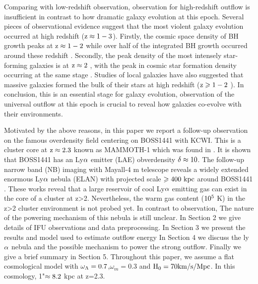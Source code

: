 \documentclass[../main.tex]{subfiles}
\begin{document}
Comparing with low-redshift observation, observation for high-redshift outflow is insufficient in contrast to how dramatic galaxy evolution at this epoch. Several pieces of observational evidence suggest that the most violent galaxy evolution occurred at high redshift ($\rm z \approx 1-3$). Firstly, the cosmic space density of BH growth peaks at $\rm z \approx 1-2$ while over half of the integrated BH growth occurred around these redshift \citep{schmidt1983quasar,richards2006sloan}. Secondly, the peak density of the most intensely star-forming galaxies is at $\rm z \approx 2$ \citep{chapman2005redshift,wardlow2011laboca}, with the peak in cosmic star formation density occurring at the same stage \citep{madau1996high,lilly1999canada,madau2014cosmic}. Studies of local galaxies have also suggested that massive galaxies formed the bulk of their stars at high redshift ($\rm z \geqslant 1-2$ ). In conclusion, this is an essential stage for galaxy evolution, observation of the universal outflow at this epoch is crucial to reveal how galaxies co-evolve with their environments. 

Motivated by the above reasons, in this paper we report a follow-up observation on the famous overdensity field centering on BOSS1441 with KCWI. This is a cluster core at $\rm z \approx 2.3$ known as MAMMOTH-1 which was found in \citet{cai2017discovery}. It is shown that BOSS1441 has an Ly$\rm \alpha$ emitter (LAE) obverdensity $\rm \delta \approx 10$. The follow-up narrow band (NB) imaging with Mayall-4 m telescope reveals a widely extended enormous Ly$\rm \alpha$ nebula (ELAN) with projected scale $\rm \geqslant 400 \ kpc$ around BOSS1441 \citep{cai2017discovery}. These works reveal that a large reservoir of cool Ly$\rm \alpha$ emitting gas can exist in the core of a cluster at z>2. Nevertheless, the warm gas content ($\rm 10^{5}$ K) in the z>2 cluster environment is not probed yet. In contrast to observation, The nature of the powering mechanism of this nebula is still unclear.
In Section 2 we give details of IFU observations and data preprocessing. In Section 3 we present the results and model used to estimate outflow energy In Section 4 we discuss the ly$\rm \alpha$ nebula and the possible mechanism to power the strong outflow. Finally we give a brief summary in Section 5. Throughout this paper, we assume a flat cosmological model with $\rm \omega_{\Lambda}=0.7$,$\omega_{m}=0.3$ and $\rm H_{0}=70 km/s/Mpc$. In this cosmology, 1"$\rm \approx 8.2$ kpc at z=2.3.
\end{document}
